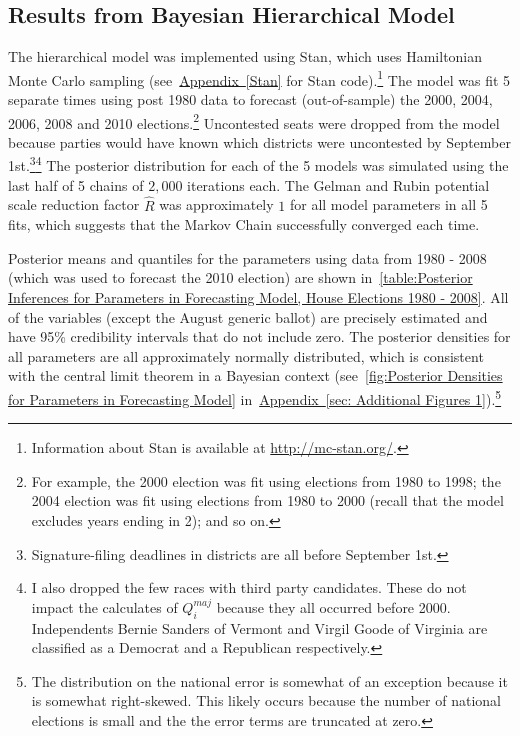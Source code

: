 \documentclass[12pt,final,fleqn]{article}
\newcommand{\aref}[1]{\hyperref[#1]{Appendix~\ref{#1}}}
\theoremstyle{plain}
\begin{document}
\subsection{Results from Bayesian Hierarchical Model} \label{sec: results hierarchical model}
The hierarchical model was implemented using Stan, which uses Hamiltonian Monte Carlo sampling (see~\aref{Stan} for Stan code).\footnote{Information about Stan is available at \url{http://mc-stan.org/}.} The model was fit 5 separate times using post 1980 data to forecast (out-of-sample) the 2000, 2004, 2006, 2008 and 2010 elections.\footnote{For example, the 2000 election was fit using elections from 1980 to 1998; the 2004 election was fit using elections from 1980 to 2000 (recall that the model excludes years ending in 2); and so on.} Uncontested seats were dropped from the model because parties would have known which districts were uncontested by September 1st.\footnote{Signature-filing deadlines in districts are all before September 1st.}\footnote{I also dropped the few races with third party candidates. These do not impact the calculates of $Q_i^{maj}$ because they all occurred before 2000. Independents Bernie Sanders of Vermont and Virgil Goode of Virginia are classified as a Democrat and a Republican respectively. } The posterior distribution for each of the 5 models was simulated using the last half of 5 chains of $2,000$ iterations each. The Gelman and Rubin potential scale reduction factor $\hat{R}$ was approximately $1$ for all model parameters in all 5 fits, which suggests that the Markov Chain successfully converged each time.

Posterior means and quantiles for the parameters using data from 1980 - 2008 (which was used to forecast the 2010 election) are shown in~\autoref{table:Posterior Inferences for Parameters in Forecasting Model, House Elections 1980 - 2008}. All of the variables (except the August generic ballot) are precisely estimated and have 95\% credibility intervals that do not include zero. The posterior densities for all parameters are all approximately normally distributed,  which is consistent with the central limit theorem in a Bayesian context (see~\autoref{fig:Posterior Densities for Parameters in Forecasting Model} in~\aref{sec: Additional Figures 1}).\footnote{The distribution on the national error is somewhat of an exception because it is somewhat right-skewed. This likely occurs because the number of national elections is small and the the error terms are truncated at zero.}
\end{document}
